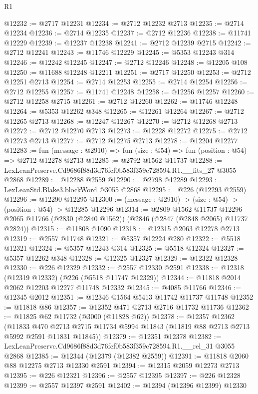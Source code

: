 \begin{lexlean}{R1}
\begin{coremodule}
@12232 := @2717 @12231
@12234 := @2712 @12232 @2713
@12235 := @2714 @12234
@12236 := @2714 @12235
@12237 := @2712 @12236
@12238 := @11741 @12229
@12239 := @12237 @12238
@12241 := @2712 @12239 @2715
@12242 := @2712 @12241
@12243 := @11746 @12229
@12245 := @5353 @12243 @314
@12246 := @12242 @12245
@12247 := @2712 @12246
@12248 := @12205 @108
@12250 := @11688 @12248 @12211
@12251 := @2717 @12250
@12253 := @2712 @12251 @2713
@12254 := @2714 @12253
@12255 := @2714 @12254
@12256 := @2712 @12255
@12257 := @11741 @12248
@12258 := @12256 @12257
@12260 := @2712 @12258 @2715
@12261 := @2712 @12260
@12262 := @11746 @12248
@12264 := @5353 @12262 @348
@12265 := @12261 @12264
@12267 := @2712 @12265 @2713
@12268 := @12247 @12267
@12270 := @2712 @12268 @2713
@12272 := @2712 @12270 @2713
@12273 := @12228 @12272
@12275 := @2712 @12273 @2713
@12277 := @2712 @12275 @2713
@12278 := @12204 @12277
@12283 := fun (message : @2910) => fun (size : @54) => fun (position : @54) => @2712 @12278 @2713
@12285 := @2792 @1562 @11737
@12288 := LexLeanPreserve.Cd9686f88d3d76fcf0b583f359c728594.R1.__fits_27 @3055 @2868
@12289 := @12288 @2559
@12290 := @2798 @12289
@12293 := LexLeanStd.Blake3.blockWord @3055 @2868
@12295 := @226 (@12293 @2559)
@12296 := @12290 @12295
@12300 := (message : @2910) -> (size : @54) -> (position : @54) -> @12285 @12296
@12314 := @2809
    @1562
    @11737
    @12296
    @2065
    @11766
    (@2830 (@2840 @1562))
    (@2846 (@2847 (@2848 @2065) @11737 @2824))
@12315 := @11808 @1090
@12318 := @12315 @2063 @12278 @2713
@12319 := @2557 @11748
@12321 := @5357 @12224 @280
@12322 := @5518 @12321
@12324 := @5357 @12243 @314
@12325 := @5518 @12324
@12327 := @5357 @12262 @348
@12328 := @12325 @12327
@12329 := @12322 @12328
@12330 := @226 @12329
@12332 := @2557 @12330 @2591
@12338 := @12318 (@12319 @12332) (@226 (@5518 @11747 @12329))
@12344 := @11818 @2014 @2062 @12203 @12277 @11748 @12332
@12345 := @4085 @11766
@12346 := @12345 @2012
@12351 := @12346 @1564 @5413 @11742 @11737 @11748
@12352 := @11818 @86
@12357 := @12352 @471 @2713 @2716 @11732 @11736
@12362 := @11825 @62 @11732 (@3000 (@11828 @62))
@12378 := @12357
    @12362
    (@11833 @470 @2713 @2715 @11734 @5994 @11843 (@11819 @88 @2713 @2713 @5992 @2591 @11831 @11845))
@12379 := @12351 @12378
@12382 := LexLeanPreserve.Cd9686f88d3d76fcf0b583f359c728594.R1.__rel_31 @3055 @2868
@12385 := @12344 (@12379 (@12382 @2559))
@12391 := @11818 @2060 @88 @12275 @2713 @12330 @2591
@12394 := @12315 @2059 @12273 @2713
@12395 := @226 @12321
@12396 := @2557 @12395
@12397 := @226 @12328
@12399 := @2557 @12397 @2591
@12402 := @12394 (@12396 @12399) @12330

\end{coremodule}
\end{lexlean}
